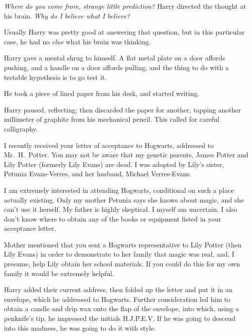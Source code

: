 \emph{Where do you come from, strange little prediction?} Harry directed the thought at his brain. \emph{Why do I believe what I believe?}

Usually Harry was pretty good at answering that question, but in this particular case, he had no \emph{clue} what his brain was thinking.

Harry gave a mental shrug to himself. A flat metal plate on a door affords pushing, and a handle on a door affords pulling, and the thing to do with a testable hypothesis is to go test it.

He took a piece of lined paper from his desk, and started writing.

\begin{writtenNote}
\end{writtenNote}

Harry paused, reflecting; then discarded the paper for another, tapping another millimeter of graphite from his mechanical pencil. This called for careful calligraphy.

\begin{writtenNote}

I recently received your letter of acceptance to Hogwarts, addressed to Mr.~H.~Potter. You may not be aware that my genetic parents, James Potter and Lily Potter (formerly Lily Evans) are dead. I was adopted by Lily’s sister, Petunia Evans-Verres, and her husband, Michael Verres-Evans.

I am extremely interested in attending Hogwarts, conditional on such a place actually existing. Only my mother Petunia says she knows about magic, and she can’t use it herself. My father is highly skeptical. I myself am uncertain. I also don’t know where to obtain any of the books or equipment listed in your acceptance letter.

Mother mentioned that you sent a Hogwarts representative to Lily Potter (then Lily Evans) in order to demonstrate to her family that magic was real, and, I presume, help Lily obtain her school materials. If you could do this for my own family it would be extremely helpful.

\end{writtenNote}

Harry added their current address, then folded up the letter and put it in an envelope, which he addressed to Hogwarts. Further consideration led him to obtain a candle and drip wax onto the flap of the envelope, into which, using a penknife’s tip, he impressed the initials H.J.P.E.V. If he was going to descend into this madness, he was going to do it with style.

